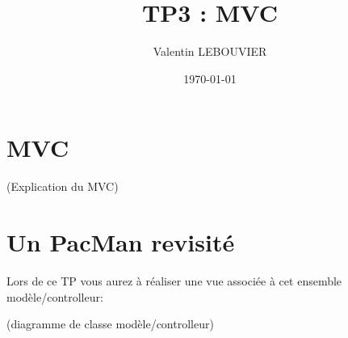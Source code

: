 \documentclass{article}
\author{Valentin LEBOUVIER}
\date{\today}
\title{TP3 : MVC}
\begin{document}
\maketitle

\section{MVC}
\label{sec-1}
(Explication du MVC)

\section{Un PacMan revisité}
\label{sec-2}
Lors de ce TP vous aurez à réaliser une vue associée à cet ensemble modèle/controlleur:

(diagramme de classe modèle/controlleur)
\end{document}
